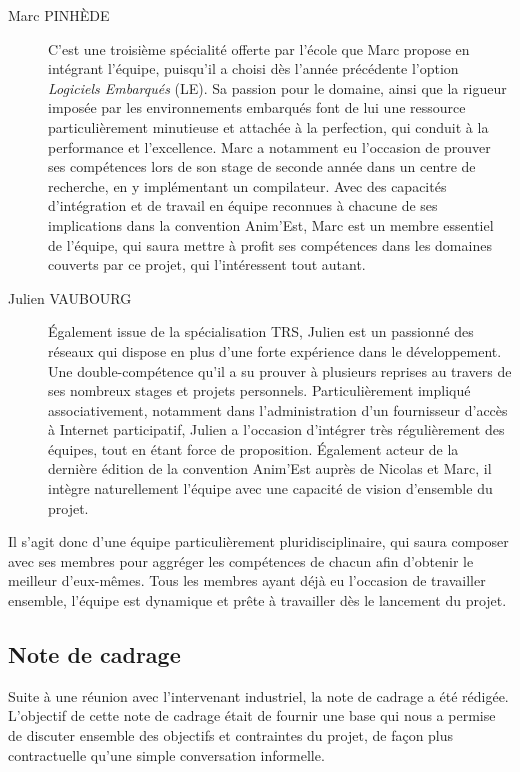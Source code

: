\begin{description}
\item[Marc PINHÈDE] C'est une troisième spécialité offerte par l'école que Marc propose en intégrant l'équipe, puisqu'il a choisi dès l'année précédente l'option \textit{Logiciels Embarqués} (LE). Sa passion pour le domaine, ainsi que la rigueur imposée par les environnements embarqués font de lui une ressource particulièrement minutieuse et attachée à la perfection, qui conduit à la performance et l'excellence. Marc a notamment eu l'occasion de prouver ses compétences lors de son stage de seconde année dans un centre de recherche, en y implémentant un compilateur. Avec des capacités d'intégration et de travail en équipe reconnues à chacune de ses implications dans la convention Anim'Est, Marc est un membre essentiel de l'équipe, qui saura mettre à profit ses compétences dans les domaines couverts par ce projet, qui l'intéressent tout autant.\\
\item[Julien VAUBOURG] Également issue de la spécialisation TRS, Julien est un passionné des réseaux qui dispose en plus d'une forte expérience dans le développement. Une double-compétence qu'il a su prouver à plusieurs reprises au travers de ses nombreux stages et projets personnels. Particulièrement impliqué associativement, notamment dans l'administration d'un fournisseur d'accès à Internet participatif, Julien a l'occasion d'intégrer très régulièrement des équipes, tout en étant force de proposition. Également acteur de la dernière édition de la convention Anim'Est auprès de Nicolas et Marc, il intègre naturellement l'équipe avec une capacité de vision d'ensemble du projet.
\end{description}

Il s'agit donc d'une équipe particulièrement pluridisciplinaire, qui saura composer avec ses membres pour aggréger les compétences de chacun afin d'obtenir le meilleur d'eux-mêmes. Tous les membres ayant déjà eu l'occasion de travailler ensemble, l'équipe est dynamique et prête à travailler dès le lancement du projet.

\subsection{Note de cadrage}

Suite à une réunion avec l'intervenant industriel, la note de cadrage a été rédigée. L'objectif de cette note de cadrage était de fournir une base qui nous a permise de discuter ensemble des objectifs et contraintes du projet, de façon plus contractuelle qu'une simple conversation informelle.

